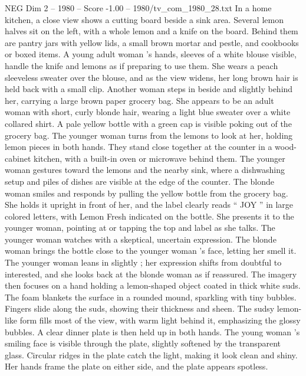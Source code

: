 \begin{textsample}{NEG Dim 2 – 1980 – Score -1.00 – 1980/tv\_com\_1980\_28.txt}  \label{ex:f2_neg_032}
In a home kitchen, a close view shows a cutting board beside a sink area.
Several lemon halves sit on the left, with a whole lemon and a knife on the board.
Behind them are pantry jars with yellow lids, a small brown mortar and pestle, and cookbooks or boxed items.
A young adult woman ’s hands, sleeves of a white blouse visible, handle the knife and lemons as if preparing to use them.
She wears a peach sleeveless sweater over the blouse, and as the view widens, her long brown hair is held back with a small clip.
Another woman steps in beside and slightly behind her, carrying a large brown paper grocery bag.
She appears to be an adult woman with short, curly blonde hair, wearing a light blue sweater over a white collared shirt.
A pale yellow bottle with a green cap is visible poking out of the grocery bag.
The younger woman turns from the lemons to look at her, holding lemon pieces in both hands.
They stand close together at the counter in a wood-cabinet kitchen, with a built-in oven or microwave behind them.
The younger woman gestures toward the lemons and the nearby sink, where a dishwashing setup and piles of dishes are visible at the edge of the counter.
The blonde woman smiles and responds by pulling the yellow bottle from the grocery bag.
She holds it upright in front of her, and the label clearly reads “ JOY ” in large colored letters, with Lemon Fresh indicated on the bottle.
She presents it to the younger woman, pointing at or tapping the top and label as she talks.
The younger woman watches with a skeptical, uncertain expression.
The blonde woman brings the bottle close to the younger woman ’s face, letting her smell it.
The younger woman leans in slightly ; her expression shifts from doubtful to interested, and she looks back at the blonde woman as if reassured.
The imagery then focuses on a hand holding a lemon-shaped object coated in thick white suds.
The foam blankets the surface in a rounded mound, sparkling with tiny bubbles.
Fingers slide along the suds, showing their thickness and sheen.
The sudsy lemon-like form fills most of the view, with warm light behind it, emphasizing the glossy bubbles.
A clear dinner plate is then held up in both hands.
The young woman ’s smiling face is visible through the plate, slightly softened by the transparent glass.
Circular ridges in the plate catch the light, making it look clean and shiny.
Her hands frame the plate on either side, and the plate appears spotless.

\end{textsample}
